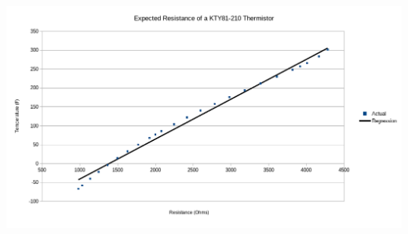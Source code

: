 \documentclass[12pt]{article}
\begin{document}
\begin{enumerate}
        \includegraphics[width=\linewidth]{prelab-chart.png}
\end{enumerate}
\end{document}
